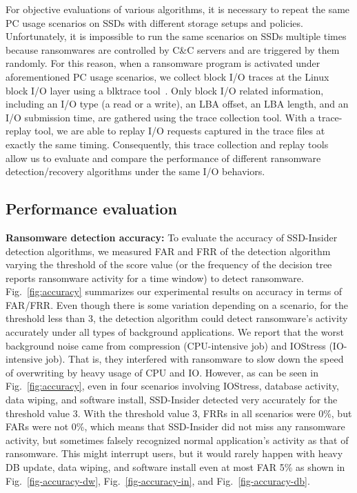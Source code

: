 \documentclass[conference]{IEEEtran}
\newcommand{\ours}{SSD-Insider}
\begin{document}
For objective evaluations of various algorithms, it is necessary to
repeat the same PC usage scenarios on SSDs with different storage
setups and policies.  Unfortunately, it is impossible to run the
same scenarios on SSDs multiple times because ransomwares are
controlled by C\&C servers and are triggered by them randomly. For
this reason, when a ransomware program is activated under
aforementioned PC usage scenarios, we collect block I/O traces at
the Linux block I/O layer using a blktrace tool~\cite{blktrace}.  Only
block I/O related information, including an I/O type (a read or a
write), an LBA offset, an LBA length, and an I/O submission time,
are gathered using the trace collection tool.  With a trace-replay
tool, we are able to replay I/O requests captured in the trace
files at exactly the same timing.  Consequently, this trace
collection and replay tools allow us to evaluate and compare the
performance of different ransomware detection/recovery algorithms
under the same I/O behaviors. 


\subsection{Performance evaluation}\label{sec:peval}
{\bf Ransomware detection accuracy:}
To evaluate the accuracy of SSD-Insider detection algorithms,
we measured FAR and FRR of the detection algorithm varying the threshold of the score value (or the frequency of the
decision tree reports ransomware activity for a time window) to detect ransomware. 
Fig.~\ref{fig:accuracy} summarizes our experimental results on accuracy in terms of FAR/FRR. 
Even though there is some variation depending on a scenario, for the threshold less than 3, 
the detection algorithm could detect ransomware's activity accurately under all types of background applications. 
We report that the worst background noise came from compression (CPU-intensive job) and IOStress (IO-intensive job).
That is, they interfered with ransomware to slow down the speed of overwriting by heavy usage of CPU and IO.
However, as can be seen in Fig.~\ref{fig:accuracy}, even in four scenarios involving IOStress, database activity, 
data wiping, and software install, \ours{} detected very accurately for the threshold value 3.
With the threshold value 3, FRRs in all scenarios were 0\%, but FARs were not 0\%, which means that
\ours{} did not miss any ransomware activity, but sometimes falsely recognized normal application's activity as 
that of ransomware. This might interrupt users, but it would rarely happen with heavy DB update, 
data wiping, and software install even at most FAR 5\% as shown
in Fig.~\ref{fig-accuracy-dw}, Fig.~\ref{fig-accuracy-in}, and Fig.~\ref{fig-accuracy-db}.
\end{document}
